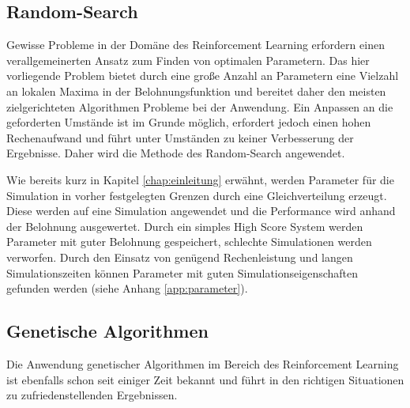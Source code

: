 	\subsection{Random-Search}
	\label{subsec:rl_rs}
		Gewisse Probleme in der Domäne des Reinforcement Learning erfordern einen verallgemeinerten Ansatz zum Finden von optimalen Parametern. Das hier vorliegende Problem bietet durch eine große Anzahl an Parametern eine Vielzahl an lokalen Maxima in der Belohnungsfunktion und bereitet daher den meisten zielgerichteten Algorithmen Probleme bei der Anwendung. Ein Anpassen an die geforderten Umstände ist im Grunde möglich, erfordert jedoch einen hohen Rechenaufwand und führt unter Umständen zu keiner Verbesserung der Ergebnisse. Daher wird die Methode des Random-Search angewendet.
		
		Wie bereits kurz in Kapitel \ref{chap:einleitung} erwähnt, werden Parameter für die Simulation in vorher festgelegten Grenzen durch eine Gleichverteilung erzeugt. Diese werden auf eine Simulation angewendet und die Performance wird anhand der Belohnung ausgewertet. Durch ein simples High Score System werden Parameter mit guter Belohnung gespeichert, schlechte Simulationen werden verworfen. Durch den Einsatz von genügend Rechenleistung und langen Simulationszeiten können Parameter mit guten Simulationseigenschaften gefunden werden (siehe Anhang \ref{app:parameter}).
	
	\subsection{Genetische Algorithmen}
	\label{subsec:gen_alg}
		Die Anwendung genetischer Algorithmen im Bereich des Reinforcement Learning ist ebenfalls schon seit einiger Zeit bekannt und führt in den richtigen Situationen zu zufriedenstellenden Ergebnissen.
		
